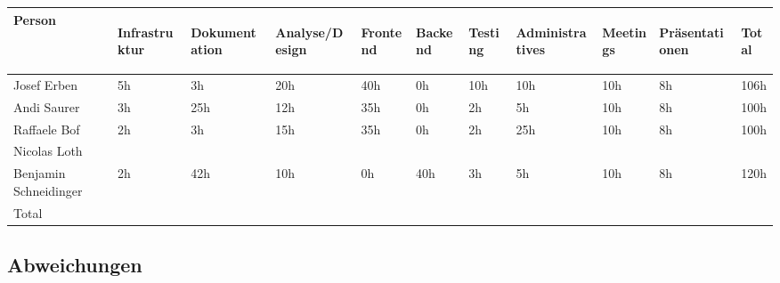 \begin{longtabu} to \textwidth { | X[l] | l | l | l | l | l | l | l | l | l | l | }
\hline
\textbf{Person} & \begin{turn}{90}\textbf{Infrastruktur}\end{turn} & \begin{turn}{90}\textbf{Dokumentation}\end{turn} & \begin{turn}{90}\textbf{Analyse/Design}\end{turn} & \begin{turn}{90}\textbf{Frontend}\end{turn} & \begin{turn}{90}\textbf{Backend}\end{turn} & \begin{turn}{90}\textbf{Testing}\end{turn} & \begin{turn}{90}\textbf{Administratives}\end{turn} & \begin{turn}{90}\textbf{Meetings}\end{turn} & \begin{turn}{90}\textbf{Präsentationen}\end{turn} & \begin{turn}{90}\textbf{Total}\end{turn} \\\hline
\endhead

Josef Erben           & 5h & 3h  & 20h & 40h & 0h  & 10h & 10h & 10h & 8h & 106h\\\hline
Andi Saurer           & 3h & 25h & 12h & 35h & 0h  & 2h  & 5h  & 10h & 8h & 100h\\\hline
Raffaele Bof          & 2h & 3h  & 15h & 35h & 0h  & 2h  & 25h & 10h & 8h & 100h\\\hline
Nicolas Loth          &    &     &     &     &     &     &     &     &    &     \\\hline
Benjamin Schneidinger & 2h & 42h & 10h & 0h  & 40h & 3h  & 5h  & 10h & 8h & 120h\\\hline
Total                 &    &     &     &     &     &     &     &     &    &     \\\hline
\end{longtabu}

\subsection{Abweichungen}\label{abweichungen}


